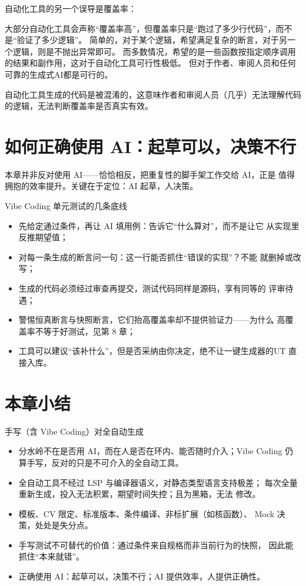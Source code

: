 \documentclass[12pt,a4paper,fontset=fandol]{ctexbook}
\begin{document}
自动化工具的另一个误导是覆盖率：

大部分自动化工具会声称“覆盖率高”，但覆盖率只是“跑过了多少行代码”，而不是“验证了多少逻辑”。
简单的，对于某个逻辑，希望满足复杂的断言，对于另一个逻辑，则是不抛出异常即可。
而多数情况，希望的是一些函数按指定顺序调用的结果和副作用，这对于自动化工具可行性极低。
但对于作者、审阅人员和任何可靠的生成式AI都是可行的。

自动化工具生成的代码是被混淆的，这意味作者和审阅人员（几乎）无法理解代码的逻辑，无法判断覆盖率是否真实有效。

\section{如何正确使用 AI：起草可以，决策不行}

本章并非反对使用 AI——恰恰相反，把重复性的脚手架工作交给 AI，正是
值得拥抱的效率提升。关键在于定位：AI 起草，人决策。

\begin{bestpractice}{Vibe Coding 单元测试的几条底线}
\begin{itemize}
  \item 先给定通过条件，再让 AI 填用例：告诉它“什么算对”，而不是让它
        从实现里反推期望值；
  \item 对每一条生成的断言问一句：这一行能否抓住“错误的实现”？不能
        就删掉或改写；
  \item 生成的代码必须经过审查再提交，测试代码同样是源码，享有同等的
        评审待遇；
  \item 警惕恒真断言与快照断言，它们抬高覆盖率却不提供验证力——为什么
        高覆盖率不等于好测试，见第 8 章；
  \item 工具可以建议“该补什么”，但是否采纳由你决定，绝不让一键生成器的UT
        直接入库。
\end{itemize}
\end{bestpractice}

\section{本章小结}

\begin{compare}{手写（含 Vibe Coding）对全自动生成}
\begin{itemize}
  \item 分水岭不在是否用 AI，而在人是否在环内、能否随时介入；Vibe
        Coding 仍算手写，反对的只是不可介入的全自动工具。
  \item 全自动工具不经过 LSP 与编译器语义，对静态类型语言支持极差；
        每次全量重新生成，投入无法积累，期望时间失控；且为黑箱，无法
        修改。
  \item 模板、CV 限定、标准版本、条件编译、非标扩展（如核函数）、
        Mock 决策，处处是失分点。
  \item 手写测试不可替代的价值：通过条件来自规格而非当前行为的快照，
        因此能抓住“本来就错”。
  \item 正确使用 AI：起草可以，决策不行；AI 提供效率，人提供正确性。
\end{itemize}
\end{compare}
\end{document}
